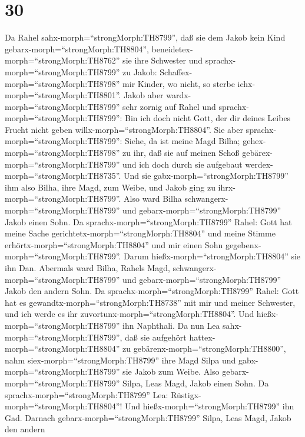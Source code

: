 \hypertarget{section-29}{%
\section{30}\label{section-29}}

 Da Rahel sahx-morph=``strongMorph:TH8799'', daß sie dem
Jakob kein Kind gebarx-morph=``strongMorph:TH8804'',
beneidetex-morph=``strongMorph:TH8762'' sie ihre Schwester und
sprachx-morph=``strongMorph:TH8799'' zu Jakob:
Schaffex-morph=``strongMorph:TH8798'' mir Kinder, wo nicht, so sterbe
ichx-morph=``strongMorph:TH8801''.  Jakob aber
wardx-morph=``strongMorph:TH8799'' sehr zornig auf Rahel und
sprachx-morph=``strongMorph:TH8799'': Bin ich doch nicht Gott, der dir
deines Leibes Frucht nicht geben willx-morph=``strongMorph:TH8804''.
 Sie aber sprachx-morph=``strongMorph:TH8799'': Siehe, da
ist meine Magd Bilha; gehex-morph=``strongMorph:TH8798'' zu ihr, daß sie
auf meinen Schoß gebärex-morph=``strongMorph:TH8799'' und ich doch durch
sie aufgebaut werdex-morph=``strongMorph:TH8735''.  Und sie
gabx-morph=``strongMorph:TH8799'' ihm also Bilha, ihre Magd, zum Weibe,
und Jakob ging zu ihrx-morph=``strongMorph:TH8799''.  Also
ward Bilha schwangerx-morph=``strongMorph:TH8799'' und
gebarx-morph=``strongMorph:TH8799'' Jakob einen Sohn.  Da
sprachx-morph=``strongMorph:TH8799'' Rahel: Gott hat meine Sache
gerichtetx-morph=``strongMorph:TH8804'' und meine Stimme
erhörtx-morph=``strongMorph:TH8804'' und mir einen Sohn
gegebenx-morph=``strongMorph:TH8799''. Darum
hießx-morph=``strongMorph:TH8804'' sie ihn Dan.  Abermals
ward Bilha, Rahels Magd, schwangerx-morph=``strongMorph:TH8799'' und
gebarx-morph=``strongMorph:TH8799'' Jakob den andern Sohn. 
Da sprachx-morph=``strongMorph:TH8799'' Rahel: Gott hat es
gewandtx-morph=``strongMorph:TH8738'' mit mir und meiner Schwester, und
ich werde es ihr zuvortunx-morph=``strongMorph:TH8804''. Und
hießx-morph=``strongMorph:TH8799'' ihn Naphthali.  Da nun
Lea sahx-morph=``strongMorph:TH8799'', daß sie aufgehört
hattex-morph=``strongMorph:TH8804'' zu
gebärenx-morph=``strongMorph:TH8800'', nahm
siex-morph=``strongMorph:TH8799'' ihre Magd Silpa und
gabx-morph=``strongMorph:TH8799'' sie Jakob zum Weibe. 
Also gebarx-morph=``strongMorph:TH8799'' Silpa, Leas Magd, Jakob einen
Sohn.  Da sprachx-morph=``strongMorph:TH8799'' Lea:
Rüstigx-morph=``strongMorph:TH8804''! Und
hießx-morph=``strongMorph:TH8799'' ihn Gad.  Darnach
gebarx-morph=``strongMorph:TH8799'' Silpa, Leas Magd, Jakob den andern
